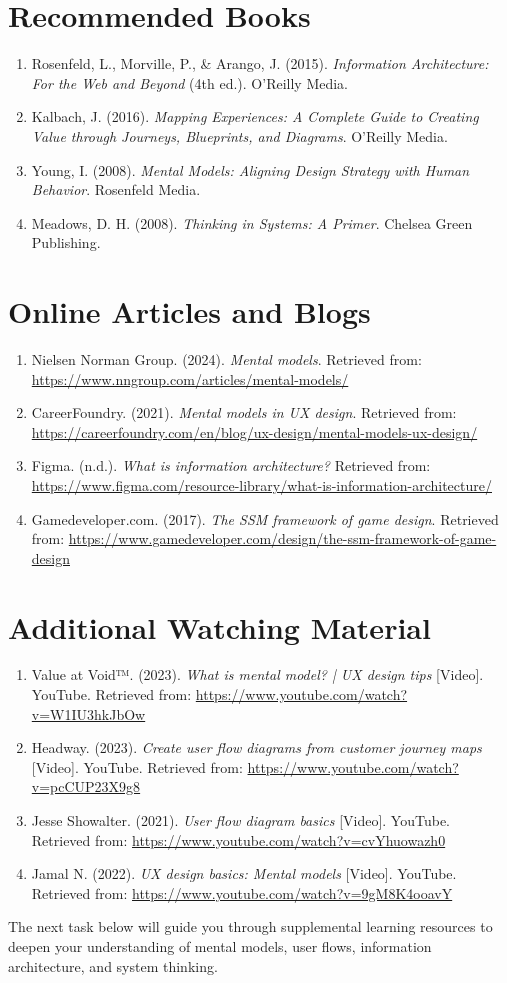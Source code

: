 \documentclass[12pt,a4paper]{article}
\begin{document}
\section*{Recommended Books}
\begin{enumerate}
    \item Rosenfeld, L., Morville, P., \& Arango, J. (2015). \textit{Information Architecture: For the Web and Beyond} (4th ed.). O’Reilly Media.
    \item Kalbach, J. (2016). \textit{Mapping Experiences: A Complete Guide to Creating Value through Journeys, Blueprints, and Diagrams}. O’Reilly Media.
    \item Young, I. (2008). \textit{Mental Models: Aligning Design Strategy with Human Behavior}. Rosenfeld Media.
    \item Meadows, D. H. (2008). \textit{Thinking in Systems: A Primer}. Chelsea Green Publishing.
\end{enumerate}

\section*{Online Articles and Blogs}
\begin{enumerate}
    \item Nielsen Norman Group. (2024). \textit{Mental models}. Retrieved from: \url{https://www.nngroup.com/articles/mental-models/}
    \item CareerFoundry. (2021). \textit{Mental models in UX design}. Retrieved from: \url{https://careerfoundry.com/en/blog/ux-design/mental-models-ux-design/}
    \item Figma. (n.d.). \textit{What is information architecture?} Retrieved from: \url{https://www.figma.com/resource-library/what-is-information-architecture/}
    \item Gamedeveloper.com. (2017). \textit{The SSM framework of game design}. Retrieved from: \url{https://www.gamedeveloper.com/design/the-ssm-framework-of-game-design}
\end{enumerate}

\section*{Additional Watching Material}
\begin{enumerate}
    \item Value at Void™. (2023). \textit{What is mental model? | UX design tips} [Video]. YouTube. Retrieved from: \url{https://www.youtube.com/watch?v=W1IU3hkJbOw}
    \item Headway. (2023). \textit{Create user flow diagrams from customer journey maps} [Video]. YouTube. Retrieved from: \url{https://www.youtube.com/watch?v=pcCUP23X9g8}
    \item Jesse Showalter. (2021). \textit{User flow diagram basics} [Video]. YouTube. Retrieved from: \url{https://www.youtube.com/watch?v=cvYhuowazh0}
    \item Jamal N. (2022). \textit{UX design basics: Mental models} [Video]. YouTube. Retrieved from: \url{https://www.youtube.com/watch?v=9gM8K4ooavY}
\end{enumerate}

The next task below will guide you through supplemental learning resources to deepen your understanding of mental models, user flows, information architecture, and system thinking.
\end{document}
